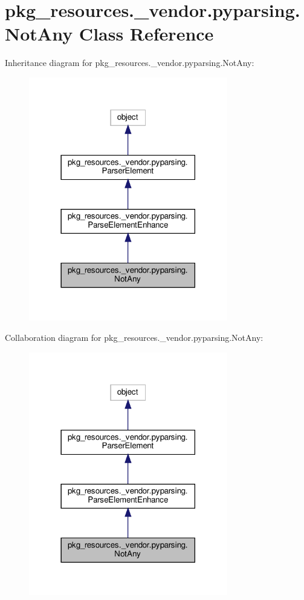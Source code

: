 \hypertarget{classpkg__resources_1_1__vendor_1_1pyparsing_1_1NotAny}{}\section{pkg\+\_\+resources.\+\_\+vendor.\+pyparsing.\+Not\+Any Class Reference}
\label{classpkg__resources_1_1__vendor_1_1pyparsing_1_1NotAny}


Inheritance diagram for pkg\+\_\+resources.\+\_\+vendor.\+pyparsing.\+Not\+Any\+:
\nopagebreak
\begin{figure}[H]
\begin{center}
\leavevmode
\includegraphics[width=246pt]{classpkg__resources_1_1__vendor_1_1pyparsing_1_1NotAny__inherit__graph}
\end{center}
\end{figure}


Collaboration diagram for pkg\+\_\+resources.\+\_\+vendor.\+pyparsing.\+Not\+Any\+:
\nopagebreak
\begin{figure}[H]
\begin{center}
\leavevmode
\includegraphics[width=246pt]{classpkg__resources_1_1__vendor_1_1pyparsing_1_1NotAny__coll__graph}
\end{center}
\end{figure}

